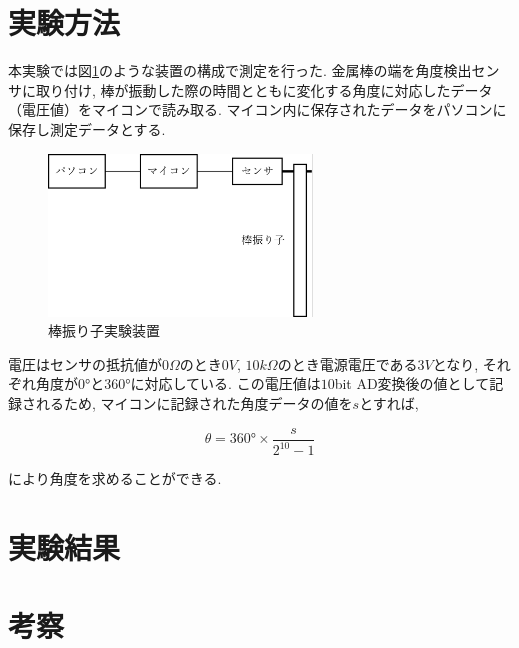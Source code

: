 \documentclass{jarticle}
\begin{document}
\section{実験方法}

本実験では図\ref{fg:rod-pendulum-method}のような装置の構成で測定を行った.
金属棒の端を角度検出センサに取り付け, 棒が振動した際の時間とともに変化する角度に対応したデータ（電圧値）をマイコンで読み取る.
マイコン内に保存されたデータをパソコンに保存し測定データとする.

\begin{figure}[H]
  \begin{center}
    \includegraphics[width=70mm]{experimental_method_picture.png}
    \caption{棒振り子実験装置}
    \label{fg:rod-pendulum-method}
  \end{center}
\end{figure}

電圧はセンサの抵抗値が$0\Omega$のとき$0V$, $10k\Omega$のとき電源電圧である$3V$となり, それ
ぞれ角度が$0°$と$360°$に対応している. この電圧値は$10$bit AD変換後の値として記
録されるため, マイコンに記録された角度データの値を$s$とすれば,

\begin{equation}
  \theta=360°\times\frac{s}{2^{10}-1}
\end{equation}

により角度を求めることができる.



\section{実験結果}



\section{考察}
\end{document}

